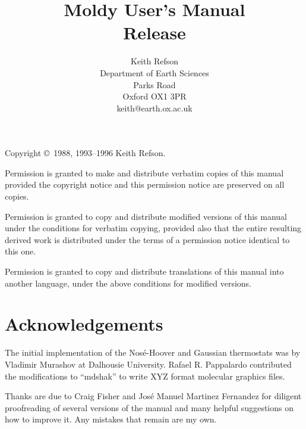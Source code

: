 \documentclass[a4paper,twoside]{report}
\title{{\Huge Moldy User's Manual}\\Release \RCSrevision}
\author{Keith Refson\\Department of Earth Sciences\\Parks Road
\\Oxford OX1 3PR\\keith@earth.ox.ac.uk\\}
\begin{document}
\maketitle
\thispagestyle{empty}

Copyright \copyright\ 1988, 1993--1996 Keith Refson.

   Permission is granted to make and distribute verbatim copies of this
manual provided the copyright notice and this permission notice are
preserved on all copies.

   Permission is granted to copy and distribute modified versions of
this manual under the conditions for verbatim copying, provided also
that the entire resulting derived work is distributed under the terms
of a permission notice identical to this one.

   Permission is granted to copy and distribute translations of this
manual into another language, under the above conditions for modified
versions.

\section*{Acknowledgements} %
The initial implementation of the Nos\'{e}-Hoover and Gaussian
thermostats was by Vladimir Murashov at Dalhousie University.
Rafael R. Pappalardo contributed the modifications to ``mdshak'' to
write XYZ format molecular graphics files.

Thanks are due to Craig Fisher and Jos\'{e} Manuel Martinez Fernandez
for diligent proofreading of several versions of the manual and many
helpful suggestions on how to improve it.  Any mistakes that remain are
my own.

\cleardoublepage
\setcounter{page}{1}
\tableofcontents
\listoftables
\listoffigures

\cleardoublepage
{}
\setcounter{page}{1}
\end{document}
